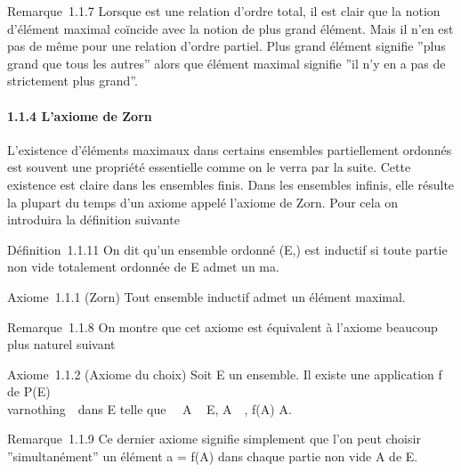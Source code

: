 Remarque~1.1.7 Lorsque \leqslant est une relation d'ordre total, il est clair
que la notion d'élément maximal coïncide avec la notion de plus grand
élément. Mais il n'en est pas de même pour une relation d'ordre partiel.
Plus grand élément signifie ''plus grand que tous les autres'' alors que
élément maximal signifie ''il n'y en a pas de strictement plus grand''.

\paragraph{1.1.4 L'axiome de Zorn}

L'existence d'éléments maximaux dans certains ensembles partiellement
ordonnés est souvent une propriété essentielle comme on le verra par la
suite. Cette existence est claire dans les ensembles finis. Dans les
ensembles infinis, elle résulte la plupart du temps d'un axiome appelé
l'axiome de Zorn. Pour cela on introduira la définition suivante

Définition~1.1.11 On dit qu'un ensemble ordonné (E,\leqslant) est inductif si
toute partie non vide totalement ordonnée de E admet un ma\jmathorant.

Axiome~1.1.1 (Zorn) Tout ensemble inductif admet un élément maximal.

Remarque~1.1.8 On montre que cet axiome est équivalent à l'axiome
beaucoup plus naturel suivant

Axiome~1.1.2 (Axiome du choix) Soit E un ensemble. Il existe une
application f de P(E) \diagdown\\varnothing~\ dans E
telle que \forall~~A \subset~ E,
A\neq~\varnothing~, f(A) \in A.

Remarque~1.1.9 Ce dernier axiome signifie simplement que l'on peut
choisir ''simultanément'' un élément a = f(A) dans chaque partie non
vide A de E.

